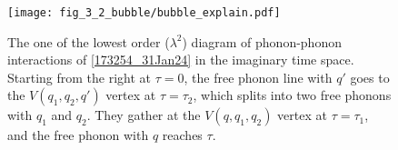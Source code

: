 \begin{figure}[htb]
\centering
  \texttt{[image: fig\_3\_2\_bubble/bubble\_explain.pdf]}
  \caption{The one of the lowest order ($\lambda^2$) diagram of phonon-phonon interactions of \cref{173254_31Jan24} in the imaginary time space. Starting from the right at $\tau=0$, the free phonon line with $q'$ goes to the $V(q_{1},q_{2},q')$ vertex at $\tau=\tau_{2}$, which splits into two free phonons with $q_{1}$ and $q_{2}$. They gather at the $V(q, q_{1},q_{2})$ vertex at $\tau=\tau_{1}$, and the free phonon with $q$ reaches $\tau$.}

\label{Fig:diagram:example}
\end{figure}
